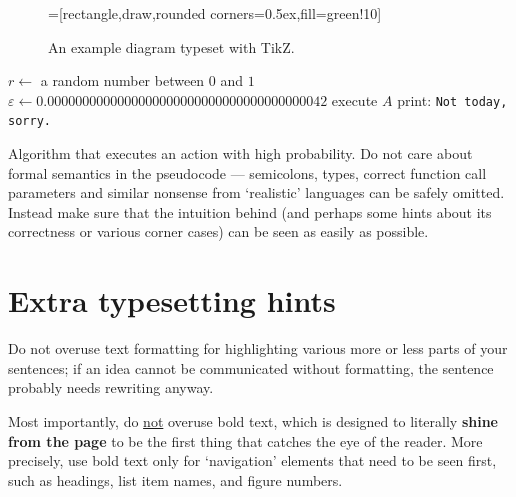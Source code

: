 \begin{figure}
\centering
{}=[rectangle,draw,rounded corners=0.5ex,fill=green!10]
\caption{An example diagram typeset with TikZ.}
\label{fig:schema}
\end{figure}

\begin{algorithm}
\begin{algorithmic}
	\State $r \gets$ a random number between $0$ and $1$
	\State $\varepsilon \gets 0.0000000000000000000000000000000000000042$
		\State execute $A$ 
	\Else
		\State print: \texttt{Not today, sorry.}
	\EndIf
\EndFunction
\end{algorithmic}
\caption{Algorithm that executes an action with high probability. Do not care about formal semantics in the pseudocode --- semicolons, types, correct function call parameters and similar nonsense from `realistic' languages can be safely omitted. Instead make sure that the intuition behind (and perhaps some hints about its correctness or various corner cases) can be seen as easily as possible.}
\label{alg:w}
\end{algorithm}

\section{Extra typesetting hints}

Do not overuse text formatting for highlighting various more or less parts of your sentences; if an idea cannot be communicated without formatting, the sentence probably needs rewriting anyway.

Most importantly, do \underline{not} overuse bold text, which is designed to literally \textbf{shine from the page} to be the first thing that catches the eye of the reader. More precisely, use bold text only for `navigation' elements that need to be seen first, such as headings, list item names, and figure numbers.

